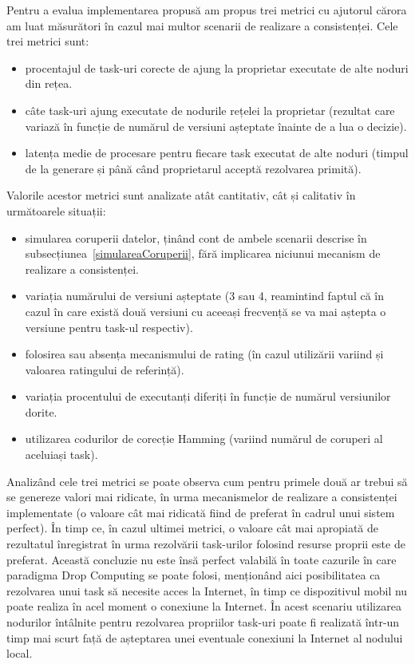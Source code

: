 \documentclass[12pt,a4paper]{report}
\begin{document}
Pentru a evalua implementarea propusă am propus trei metrici cu ajutorul cărora am luat măsurători în cazul mai multor scenarii de realizare a consistenței. Cele trei metrici sunt:
\begin{itemize}
	\item procentajul de task-uri corecte de ajung la proprietar executate de alte noduri din rețea.
	\item câte task-uri ajung executate de nodurile rețelei la proprietar (rezultat care variază în funcție de numărul de versiuni așteptate înainte de a lua o decizie).
	\item latența medie de procesare pentru fiecare task executat de alte noduri (timpul de la generare și până când proprietarul acceptă rezolvarea primită).
\end{itemize}
Valorile acestor metrici sunt analizate atât cantitativ, cât și calitativ în următoarele situații:
\begin{itemize}
	\item simularea coruperii datelor, ținând cont de ambele scenarii descrise în subsecțiunea~\ref{simulareaCoruperii}, fără implicarea niciunui mecanism de realizare a consistenței.
	\item variația numărului de versiuni așteptate (3 sau 4, reamintind faptul că în cazul în care există două versiuni cu aceeași frecvență se va mai aștepta o versiune pentru task-ul respectiv).
	\item folosirea sau absența mecanismului de rating (în cazul utilizării variind și valoarea ratingului de referință).
	\item variația procentului de executanți diferiți în funcție de numărul versiunilor dorite.
	\item utilizarea codurilor de corecție Hamming (variind numărul de coruperi al aceluiași task).
\end{itemize}

Analizând cele trei metrici se poate observa cum pentru primele două ar trebui să se genereze valori mai ridicate, în urma mecanismelor de realizare a consistenței implementate (o valoare cât mai ridicată fiind de preferat în cadrul unui sistem perfect). În timp ce, în cazul ultimei metrici, o valoare cât mai apropiată de rezultatul înregistrat în urma rezolvării task-urilor folosind resurse proprii este de preferat. Această concluzie nu este însă perfect valabilă în toate cazurile în care paradigma Drop Computing se poate folosi, menționând aici posibilitatea ca rezolvarea unui task să necesite acces la Internet, în timp ce dispozitivul mobil nu poate realiza în acel moment o conexiune la Internet. În acest scenariu utilizarea nodurilor întâlnite pentru rezolvarea propriilor task-uri poate fi realizată într-un timp mai scurt față de așteptarea unei eventuale conexiuni la Internet al nodului local.
\end{document}
